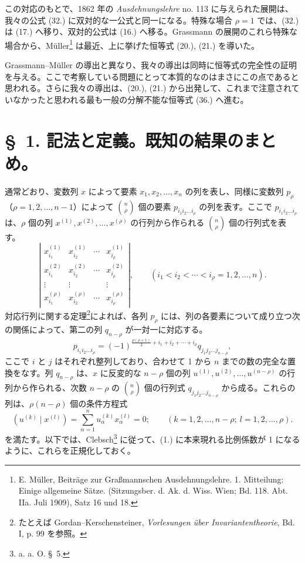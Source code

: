 \documentclass[11pt]{jlreq}
\begin{document}
この対応のもとで、1862 年の \emph{Ausdehnungslehre} no. 113 に与えられた展開は、我々の公式 (32.) に双対的な一公式と同一になる。特殊な場合 $\rho=1$ では、(32.) は (17.) へ移り、双対的公式は (16.) へ移る。Grassmann の展開のこれら特殊な場合から、Müller\footnote{E. Müller, Beiträge zur Graßmannschen Ausdehnungslehre. 1. Mitteilung: Einige allgemeine Sätze. (Sitzungsber. d. Ak. d. Wiss. Wien; Bd. 118. Abt. IIa. Juli 1909), Satz 16 und 18.} は最近、上に挙げた恒等式 (20.), (21.) を導いた。

Grassmann--Müller の導出と異なり、我々の導出は同時に恒等式の完全性の証明を与える。ここで考察している問題にとって本質的なのはまさにこの点であると思われる。さらに我々の導出は、(20.), (21.) から出発して、これまで注意されていなかったと思われる最も一般の分解不能な恒等式 (36.) へ進む。

\section*{\S\ 1. 記法と定義。既知の結果のまとめ。}
通常どおり、変数列 $x$ によって要素 $x_1,x_2,\ldots,x_n$ の列を表し、同様に変数列 $p_\rho$（$\rho=1,2,\ldots,n-1$）によって $\binom n\rho$ 個の要素 $p_{i_1i_2\ldots i_\rho}$ の列を表す。ここで $p_{i_1i_2\ldots i_\rho}$ は、$\rho$ 個の列 $x^{(1)},x^{(2)},\ldots,x^{(\rho)}$ の行列から作られる $\binom n\rho$ 個の行列式を表す。
\[
\left|\begin{array}{cccc}
 x_{i_1}^{(1)}&x_{i_2}^{(1)}&\cdots&x_{i_\rho}^{(1)}\\
 x_{i_1}^{(2)}&x_{i_2}^{(2)}&\cdots&x_{i_\rho}^{(2)}\\
 \vdots&\vdots&&\vdots\\
 x_{i_1}^{(\rho)}&x_{i_2}^{(\rho)}&\cdots&x_{i_\rho}^{(\rho)}
\end{array}\right|,
\qquad (i_1<i_2<\cdots<i_\rho=1,2,\ldots,n).
\]
対応行列に関する定理\footnote{たとえば Gordan--Kerschensteiner, \emph{Vorlesungen über Invariantentheorie}, Bd. I, p. 99 を参照。}によれば、各列 $p_\rho$ には、列の各要素について成り立つ次の関係によって、第二の列 $q_{n-\rho}$ が一対一に対応する。
\begin{equation}
 p_{i_1i_2\ldots i_\rho}=(-1)^{\frac{\rho(\rho+1)}{2}+i_1+i_2+\cdots+i_\rho}q_{j_1j_2\ldots j_{n-\rho}},
\tag{1}
\end{equation}
ここで $i$ と $j$ はそれぞれ整列しており、合わせて 1 から $n$ までの数の完全な置換をなす。列 $q_{n-\rho}$ は、$x$ に反変的な $n-\rho$ 個の列 $u^{(1)},u^{(2)},\ldots,u^{(n-\rho)}$ の行列から作られる、次数 $n-\rho$ の $\binom n\rho$ 個の行列式 $q_{j_1j_2\ldots j_{n-\rho}}$ から成る。これらの列は、$\rho(n-\rho)$ 個の条件方程式
\begin{equation}
 (u^{(k)}\mid x^{(l)})=\sum_{\alpha=1}^{n}u_\alpha^{(k)}x_\alpha^{(l)}=0;
 \qquad (k=1,2,\ldots,n-\rho;\ l=1,2,\ldots,\rho).
\tag{2}
\end{equation}
を満たす。以下では、Clebsch\footnote{a. a. O. \S\ 5.} に従って、(1.) に本来現れる比例係数が 1 になるように、これらを正規化しておく。
\end{document}
